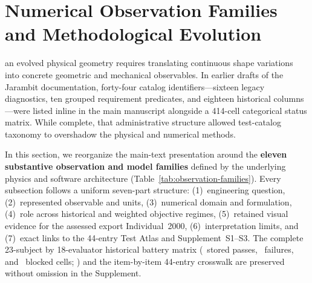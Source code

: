 \section{Numerical Observation Families and Methodological Evolution}
\label{sec:battery}
 an evolved physical geometry requires translating continuous shape variations into concrete geometric and mechanical observables. In earlier drafts of the Jarambit documentation, forty-four catalog identifiers---sixteen legacy  diagnostics, ten grouped  requirement predicates, and eighteen historical  columns---were listed inline in the main manuscript alongside a 414-cell categorical status matrix. While complete, that administrative structure allowed test-catalog taxonomy to overshadow the physical and numerical methods.

In this section, we reorganize the main-text presentation around the \textbf{eleven substantive observation and model families} defined by the underlying physics and software architecture (Table~\ref{tab:observation-families}). Every subsection follows a uniform seven-part structure: (1)~engineering question, (2)~represented observable and units, (3)~numerical domain and formulation, (4)~role across historical and weighted objective regimes, (5)~retained visual evidence for the assessed export Individual~2000, (6)~interpretation limits, and (7)~exact links to the 44-entry Test Atlas and Supplement~S1--S3. The complete 23-subject by 18-evaluator historical battery matrix (\BatteryPass\ stored passes, \BatteryFail\ failures, and \BatteryBlocked\ blocked cells; ) and the item-by-item 44-entry crosswalk are preserved without omission in the Supplement.

